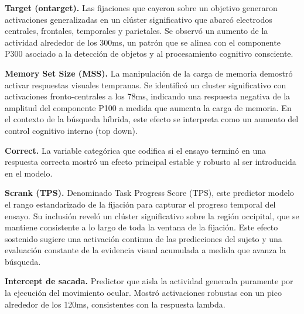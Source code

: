 \textbf{Target (ontarget).} Las fijaciones que cayeron sobre un objetivo generaron activaciones generalizadas en un clúster significativo que abarcó electrodos centrales, frontales, temporales y parietales. Se observó un aumento de la actividad alrededor de los 300ms, un patrón que se alinea con el componente P300 asociado a la detección de objetos y al procesamiento cognitivo consciente.

\textbf{Memory Set Size (MSS).}  La manipulación de la carga de memoria demostró activar respuestas visuales tempranas. Se identificó un cluster significativo con activaciones fronto-centrales a los 78ms, indicando una respuesta negativa de la amplitud del componente P100 a medida que aumenta la carga de memoria. En el contexto de la búsqueda híbrida, este efecto se interpreta como un aumento del control cognitivo interno (top down).

\textbf{Correct.} La variable categórica que codifica si el ensayo terminó en una respuesta correcta mostró un efecto principal estable y robusto al ser introducida en el modelo.

\textbf{Scrank (TPS).} Denominado Task Progress Score (TPS), este predictor modelo el rango estandarizado de la fijación para capturar el progreso temporal del ensayo. Su inclusión reveló un clúster significativo sobre la región occipital, que se mantiene consistente a lo largo de toda la ventana de la fijación. Este efecto sostenido sugiere una activación continua de las predicciones del sujeto y una evaluación constante de la evidencia visual acumulada a medida que avanza la búsqueda.

\textbf{Intercept de sacada.} Predictor que aisla la actividad generada puramente por la ejecución del movimiento ocular. Mostró activaciones robustas con un pico alrededor de los 120ms, consistentes con la respuesta lambda.